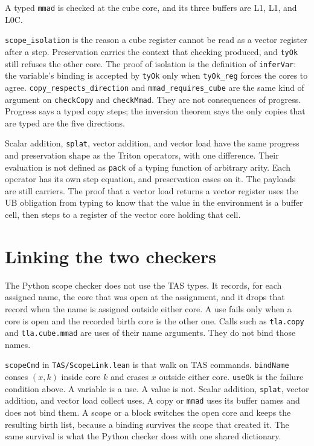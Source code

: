 \documentclass[a4paper,UKenglish,anonymous,cleveref,autoref]{lipics-v2021}
\begin{document}
\begin{theorem}
A typed \texttt{mmad} is checked at the cube core, and its three buffers are L1, L1, and L0C.
\end{theorem}

\texttt{scope\_isolation} is the reason a cube register cannot be read as a vector register after a step.
Preservation carries the context that checking produced, and \texttt{tyOk} still refuses the other core.
The proof of isolation is the definition of \texttt{inferVar}: the variable's binding is accepted by \texttt{tyOk} only when \texttt{tyOk\_reg} forces the cores to agree.
\texttt{copy\_respects\_direction} and \texttt{mmad\_requires\_cube} are the same kind of argument on \texttt{checkCopy} and \texttt{checkMmad}.
They are not consequences of progress.
Progress says a typed copy steps; the inversion theorem says the only copies that are typed are the five directions.

Scalar addition, \texttt{splat}, vector addition, and vector load have the same progress and preservation shape as the Triton operators, with one difference.
Their evaluation is not defined as \texttt{pack} of a typing function of arbitrary arity.
Each operator has its own step equation, and preservation cases on it.
The payloads are still carriers.
The proof that a vector load returns a vector register uses the UB obligation from typing to know that the value in the environment is a buffer cell, then steps to a register of the vector core holding that cell.

\section{Linking the two checkers}
\label{sec:link}

The Python scope checker does not use the TAS types.
It records, for each assigned name, the core that was open at the assignment, and it drops that record when the name is assigned outside either core.
A use fails only when a core is open and the recorded birth core is the other one.
Calls such as \texttt{tla.copy} and \texttt{tla.cube.mmad} are uses of their name arguments.
They do not bind those names.

\texttt{scopeCmd} in \texttt{TAS/ScopeLink.lean} is that walk on TAS commands.
\texttt{bindName} conses \((x, k)\) inside core \(k\) and erases \(x\) outside either core.
\texttt{useOk} is the failure condition above.
A variable is a use.
A value is not.
Scalar addition, \texttt{splat}, vector addition, and vector load collect uses.
A copy or \texttt{mmad} uses its buffer names and does not bind them.
A scope or a block switches the open core and keeps the resulting birth list, because a binding survives the scope that created it.
The same survival is what the Python checker does with one shared dictionary.
\end{document}
